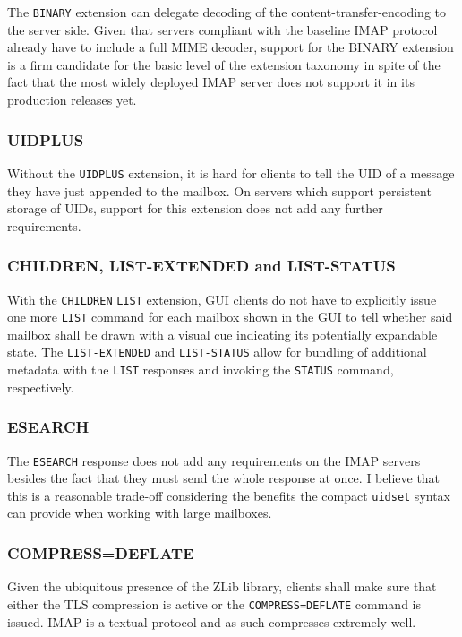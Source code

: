 \documentclass[trojita]{subfiles}
\begin{document}
The {\tt BINARY} extension can delegate decoding of the content-transfer-encoding to the server side.  Given that
servers compliant with the baseline IMAP protocol already have to include a full MIME decoder, support for the BINARY
extension is a firm candidate for the basic level of the extension taxonomy in spite of the fact that the most widely
deployed IMAP server does not support it in its production releases yet.

\subsubsection{UIDPLUS}

Without the {\tt UIDPLUS} extension, it is hard for clients to tell the UID of a message they have just appended to the
mailbox.  On servers which support persistent storage of UIDs, support for this extension does not add any further
requirements.

\subsubsection{CHILDREN, LIST-EXTENDED and LIST-STATUS}

With the {\tt CHILDREN} {\tt LIST} extension, GUI clients do not have to explicitly issue one more {\tt LIST} command
for each mailbox shown in the GUI to tell whether said mailbox shall be drawn with a visual cue indicating its
potentially expandable state.  The {\tt LIST-EXTENDED} and {\tt LIST-STATUS} allow for bundling of additional metadata
with the {\tt LIST} responses and invoking the {\tt STATUS} command, respectively.

\subsubsection{ESEARCH}

The {\tt ESEARCH} response does not add any requirements on the IMAP servers besides the fact that they must send the
whole response at once.  I believe that this is a reasonable trade-off considering the benefits the compact {\tt uidset}
syntax can provide when working with large mailboxes.

\subsubsection{COMPRESS=DEFLATE}

Given the ubiquitous presence of the ZLib library, clients shall make sure that either the TLS compression is active or
the {\tt COMPRESS=DEFLATE} command is issued.  IMAP is a textual protocol and as such compresses extremely well.
\end{document}
